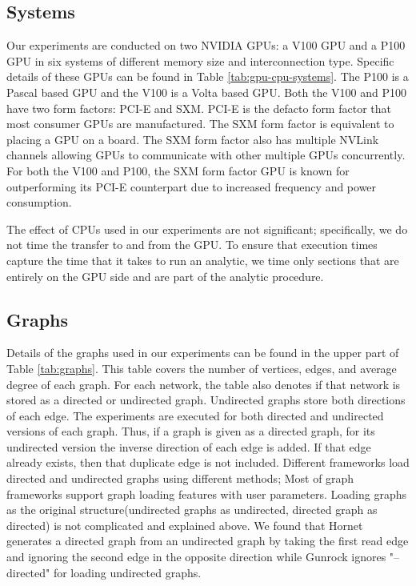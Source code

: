 \subsection{Systems}
Our experiments are conducted on two NVIDIA GPUs: a V100 GPU and a P100 GPU in six systems of different memory size and interconnection type. Specific details of these GPUs can be found in Table \ref{tab:gpu-cpu-systems}. 
The P100 is a Pascal based GPU and the V100 is a Volta based GPU. 
Both the V100 and P100 have two form factors: PCI-E and SXM. PCI-E is the defacto form factor that most consumer GPUs are manufactured. The SXM form factor is equivalent to placing a GPU on a board. The SXM form factor also has multiple NVLink channels allowing GPUs to communicate with other multiple GPUs concurrently. For both the V100 and P100, the SXM form factor GPU is known for outperforming its PCI-E counterpart due to increased frequency and power consumption.


The effect of CPUs used in our experiments are not significant; specifically, we do not time the transfer to and from the GPU. To ensure that execution times capture the time that it takes to run an analytic, we time only sections that are entirely on the GPU side and are part of the analytic procedure.


\subsection{Graphs}
Details of the graphs used in our experiments can be found in the upper part of Table \ref{tab:graphs}. This table covers the number of vertices, edges, and average degree of each graph. For each network, the table also denotes if that network is stored as a directed or undirected graph. Undirected graphs store both directions of each edge. The experiments are executed for both directed and undirected versions of each graph. Thus, if a graph is given as a directed graph, for its undirected version the inverse direction of each edge is added. If that edge already exists, then that duplicate edge is not included. Different frameworks load directed and undirected graphs using different methods; Most of graph frameworks support graph loading features with user parameters. Loading graphs as the original structure(undirected graphs as undirected, directed graph as directed) is not complicated and explained above. We found that Hornet generates a directed graph from an undirected graph by taking the first read edge and ignoring the second edge in the opposite direction while Gunrock ignores "--directed" for loading undirected graphs. 


